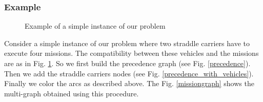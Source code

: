 \documentclass[journal]{IEEEtran}
\let\MYoriglatexcaption\caption
\renewcommand{\caption}[2][\relax]{\MYoriglatexcaption[#2]{#2}}
\begin{document}
\subsubsection{Example}
\medskip
\begin{figure}[h]
	\caption{Example of a simple instance of our problem}
	\label{problem_description}
\end{figure}
Consider a simple instance of our problem where two straddle carriers have to
execute four missions. The compatibility between these vehicles and the missions
are as in Fig. \ref{problem_description}. So we first build the precedence graph
(see Fig. \ref{precedence}). Then we add the straddle carriers nodes (see Fig.
\ref{precedence_with_vehicles}). Finally we color the arcs as described above.
The Fig. \ref{missiongraph} shows the multi-graph obtained using this procedure.\\
\end{document}
